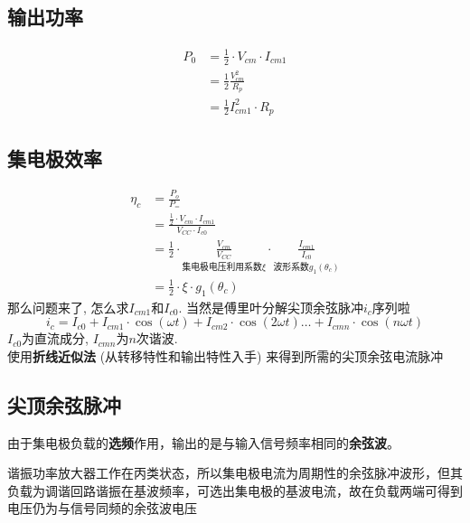 \documentclass[a4paper]{report}
\begin{document}
\subsection{输出功率}
\begin{align*}
  P_0&=\frac{1}{2}\cdot V_{cm}\cdot I_{cm1}\\
  &=\frac{1}{2} \frac{V_{cm}^2}{R_p}\\
  &= \frac{1}{2}I_{cm1}^2\cdot R_p
\end{align*}

\subsection{集电极效率}
\begin{align*}
  \eta_c&=\frac{P_o}{P_=}\\
  &=\frac{\frac{1}{2}\cdot V_{cm}\cdot I_{cm1}}{V_{CC}\cdot I_{c0}}\\
  &=\frac{1}{2}\cdot \underset{\text{集电极电压利用系数$\xi$}}{\frac{V_{cm}}{V_{CC}}}
  \cdot \underset{\text{波形系数$g_1(\theta_c)$}}{\frac{I_{cm1}}{I_{c0}}}\\
  &=\frac{1}{2}\cdot \xi\cdot g_1(\theta_c)
\end{align*}
那么问题来了, 怎么求$I_{cm1}$和$I_{c0}$. 当然是傅里叶分解尖顶余弦脉冲$i_c$序列啦
$$i_c=I_{c0}+I_{cm1}\cdot\cos(\omega t)+I_{cm2}\cdot\cos(2\omega t)\dots +I_{cmn}\cdot\cos(n\omega t)$$
$I_{c0}$为直流成分, $I_{cmn}$为$n$次谐波. \\
使用\textbf{折线近似法} (从转移特性和输出特性入手) 来得到所需的尖顶余弦电流脉冲
\subsection{尖顶余弦脉冲}
由于集电极负载的\textbf{选频}作用，输出的是与输入信号频率相同的\textbf{余弦波}。

谐振功率放大器工作在丙类状态，所以集电极电流为周期性的余弦脉冲波形，但其负载为调谐回路谐振在基波频率，可选出集电极的基波电流，故在负载两端可得到电压仍为与信号同频的余弦波电压
\end{document}

